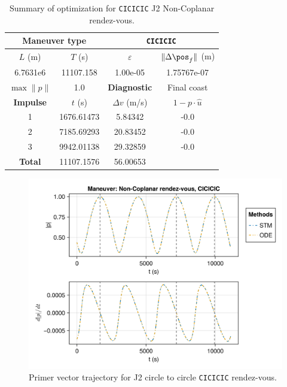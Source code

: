 \begin{table}[htpb]
    \centering
    \begin{tabular}{cccc} \toprule
    \multicolumn{2}{c}{\textbf{Maneuver type}} & \multicolumn{2}{c}{\texttt{CICICIC}} \\ \midrule
    \(L\) (m) & \(T\) (s) & \(\varepsilon\) & \(\lVert \Delta \pos_{f} \rVert\) (m)    \\ \midrule
    6.7631e6          & 11107.158          & 1.00e-05                & 1.75767e-07                        \\ \midrule
    \(\max \lVert p \rVert\) & 1.0     & \textbf{Diagnostic}   & Final coast        \\ \midrule
    \textbf{Impulse} & \(t\) (s) & \(\Delta v\) (m/s) & \(1 - p \cdot \hat{u}\) \\ \midrule
    1                 & 1676.61473          & 5.84342             & -0.0                    \\
    2                 & 7185.69293          & 20.83452             & -0.0                    \\
    3                 & 9942.01138          & 29.32859             & -0.0                    \\\midrule
    \textbf{Total}   & 11107.1576          & 56.00653             &                     \\ \bottomrule   
    \end{tabular}
    \caption{Summary of optimization for \texttt{CICICIC} J2 Non-Coplanar rendez-vous.}
    \label{tab:J2_nr_CICICIC_tab}
\end{table}

\begin{figure}[htbp]
    \centering
    \includegraphics[width=\linewidth]{../results/j2/ipv_noncop/CICICIC_primer_vector.png}
    \caption{Primer vector trajectory for J2 circle to circle \texttt{CICICIC} rendez-vous.}
    \label{fig:j2_ncop_CICICIC_pv}
\end{figure}

